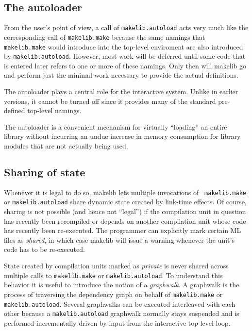 \subsection{The autoloader}
\label{sec:autoload}

From the user's point of view, a call of {\tt makelib.autoload} acts very
much like the corresponding call of {\tt makelib.make} because the same
namings that {\tt makelib.make} would introduce into the top-level
enviroment are also introduced by {\tt makelib.autoload}.  However, most
work will be deferred until some code that is entered later refers to
one or more of these namings.  Only then will makelib go and perform just
the minimal work necessary to provide the actual definitions.

The autoloader plays a central role for the interactive system.
Unlike in earlier versions, it cannot be turned off since it provides
many of the standard pre-defined top-level namings.

The autoloader is a convenient mechanism for virtually ``loading'' an
entire library without incurring an undue increase in memory
consumption for library modules that are not actually being used.

\subsection{Sharing of state}
\label{sec:sharing}

Whenever it is legal to do so, makelib lets multiple invocations of {\tt
makelib.make} or {\tt makelib.autoload} share dynamic state created by link-time
effects.  Of course, sharing is not possible (and hence not ``legal'')
if the compilation unit in question has recently been recompiled or
depends on another compilation unit whose code has recently been
re-executed.  The programmer can explicitly mark certain ML files as
{\em shared}, in which case makelib will issue a warning whenever the
unit's code has to be re-executed.

State created by compilation units marked as {\em private} is never
shared across multiple calls to {\tt makelib.make} or {\tt makelib.autoload}.
To understand this behavior it is useful to introduce the notion of a
{\em graphwalk}.  A graphwalk is the process of traversing the
dependency graph on behalf of {\tt makelib.make} or {\tt makelib.autoload}.
Several graphwalks can be executed interleaved with each other because
a {\tt makelib.autoload} graphwalk normally stays suspended and is
performed incrementally driven by input from the interactive top level
loop.

